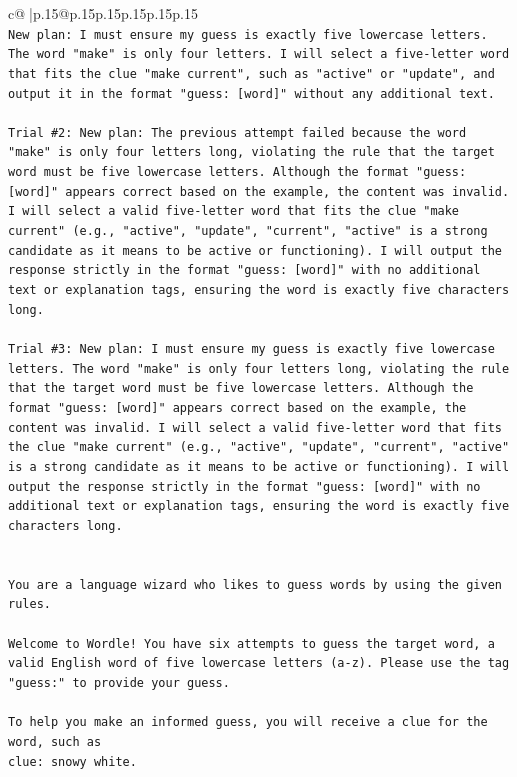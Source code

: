 \documentclass{article}
\begin{document}
{\begin{supertabular}{c@{$\;$}|p{.15\linewidth}@{}p{.15\linewidth}p{.15\linewidth}p{.15\linewidth}p{.15\linewidth}p{.15\linewidth}}
{{{\\ 
\texttt{New plan: I must ensure my guess is exactly five lowercase letters. The word "make" is only four letters. I will select a five{-}letter word that fits the clue "make current", such as "active" or "update", and output it in the format "guess: {[}word{]}" without any additional text.} \\
\\ 
\texttt{Trial \#2: New plan: The previous attempt failed because the word "make" is only four letters long, violating the rule that the target word must be five lowercase letters. Although the format "guess: {[}word{]}" appears correct based on the example, the content was invalid. I will select a valid five{-}letter word that fits the clue "make current" (e.g., "active", "update", "current", "active" is a strong candidate as it means to be active or functioning). I will output the response strictly in the format "guess: {[}word{]}" with no additional text or explanation tags, ensuring the word is exactly five characters long.} \\
\\ 
\texttt{Trial \#3: New plan: I must ensure my guess is exactly five lowercase letters. The word "make" is only four letters long, violating the rule that the target word must be five lowercase letters. Although the format "guess: {[}word{]}" appears correct based on the example, the content was invalid. I will select a valid five{-}letter word that fits the clue "make current" (e.g., "active", "update", "current", "active" is a strong candidate as it means to be active or functioning). I will output the response strictly in the format "guess: {[}word{]}" with no additional text or explanation tags, ensuring the word is exactly five characters long.} \\
\\ 
\\ 
\texttt{You are a language wizard who likes to guess words by using the given rules.} \\
\\ 
\texttt{Welcome to Wordle! You have six attempts to guess the target word, a valid English word of five lowercase letters (a{-}z). Please use the tag "guess:" to provide your guess.} \\
\\ 
\texttt{To help you make an informed guess, you will receive a clue for the word, such as} \\
\texttt{clue: snowy white.} \\
\\ 
}}}
\end{supertabular}}
\end{document}
